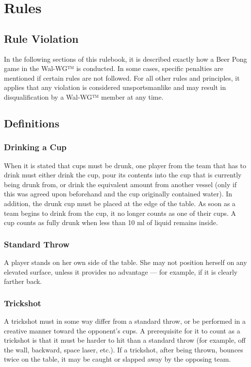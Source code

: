 \documentclass[a5paper, 12pt]{book}
\begin{document}
\part {Rules}\label{part:regeln}
\chapter*{Rule Violation}\label{chap:regelverstoß}
In the following sections of this rulebook, it is described exactly how a Beer Pong game in the Wal-WG™ is conducted. In some cases, specific penalties are mentioned if certain rules are not followed. For all other rules and principles, it applies that any violation is considered unsportsmanlike and may result in disqualification by a Wal-WG™ member at any time.

\chapter{Definitions}\label{chap:definitionen}

\section{Drinking a Cup}\label{sec:bechertrinken}
When it is stated that cups must be drunk, one player from the team that has to drink must either drink the cup, pour its contents into the cup that is currently being drunk from, or drink the equivalent amount from another vessel (only if this was agreed upon beforehand and the cup originally contained water). In addition, the drunk cup must be placed at the edge of the table. As soon as a team begins to drink from the cup, it no longer counts as one of their cups.  
A cup counts as fully drunk when less than 10 ml of liquid remains inside.

\section{Standard Throw}\label{sec:standardwurf}
A player stands on her own side of the table. She may not position herself on any elevated surface, unless it provides no advantage — for example, if it is clearly farther back.

\section{Trickshot}\label{sec:trickshot}
A trickshot must in some way differ from a standard throw, or be performed in a creative manner toward the opponent’s cups.  
A prerequisite for it to count as a trickshot is that it must be harder to hit than a standard throw (for example, off the wall, backward, space laser, etc.).  
If a trickshot, after being thrown, bounces twice on the table, it may be caught or slapped away by the opposing team.
\end{document}
